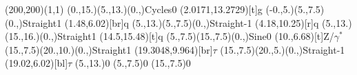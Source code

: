 \documentclass[12pt]{article}
\begin{document}
 
 \thispagestyle{empty}
	
 \begin{feynartspicture}(200,200)(1,1) 
 \FADiagram{} 
\FAProp(0.,15.)(5.,13.)(0.,){Cycles}{0}
\FALabel(2.0171,13.2729)[t]{g}
\FAProp(-0.,5.)(5.,7.5)(0.,){Straight}{1}
\FALabel(1.48,6.02)[br]{q}
\FAProp(5.,13.)(5.,7.5)(0.,){Straight}{-1}
\FALabel(4.18,10.25)[r]{q}
\FAProp(5.,13.)(15.,16.)(0.,){Straight}{1}
\FALabel(14.5,15.48)[t]{q}
\FAProp(5.,7.5)(15.,7.5)(0.,){Sine}{0}
\FALabel(10.,6.68)[t]{Z/$\gamma^*$}
\FAProp(15.,7.5)(20.,10.)(0.,){Straight}{1}
\FALabel(19.3048,9.964)[br]{$\tau$}
\FAProp(15.,7.5)(20.,5.)(0.,){Straight}{-1}
\FALabel(19.02,6.02)[bl]{$\tau$}
\FAVert(5.,13.){0}
\FAVert(5.,7.5){0}
\FAVert(15.,7.5){0}
	
 
 \end{feynartspicture} 
 
\end{document}
